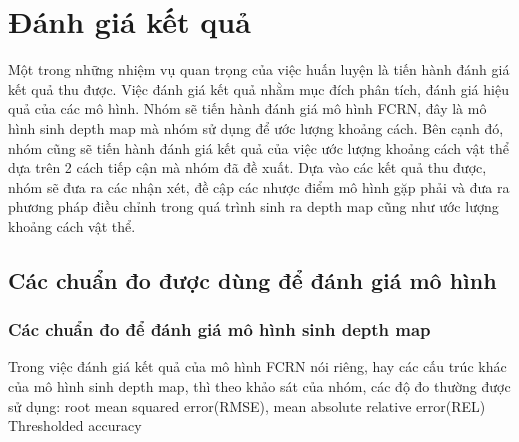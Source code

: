 \chapter{Đánh giá kết quả}

Một trong những nhiệm vụ quan trọng của việc huấn luyện là tiến hành đánh giá kết quả thu được. Việc đánh giá kết quả nhằm mục đích phân tích, đánh giá hiệu quả của các mô hình. Nhóm sẽ tiến hành đánh giá mô hình FCRN, đây là mô hình sinh depth map mà nhóm sử dụng để ước lượng khoảng cách. Bên cạnh đó, nhóm cũng sẽ tiến hành đánh giá kết quả của việc ước lượng khoảng cách vật thể dựa trên 2 cách tiếp cận mà nhóm đã đề xuất. Dựa vào các kết quả thu được, nhóm sẽ đưa ra các nhận xét, đề cập các nhược điểm mô hình gặp phải và đưa ra phương pháp điều chỉnh trong quá trình sinh ra depth map cũng như ước lượng khoảng cách vật thể. 

\section{Các chuẩn đo được dùng để đánh giá mô hình}

\subsection{Các chuẩn đo để đánh giá mô hình sinh depth map}

Trong việc đánh giá kết quả của mô hình FCRN nói riêng, hay các cấu trúc khác của mô hình sinh depth map, thì theo khảo sát của nhóm, các độ đo thường được sử dụng: root mean squared error(RMSE), mean absolute relative error(REL)  Thresholded accuracy\\ 



